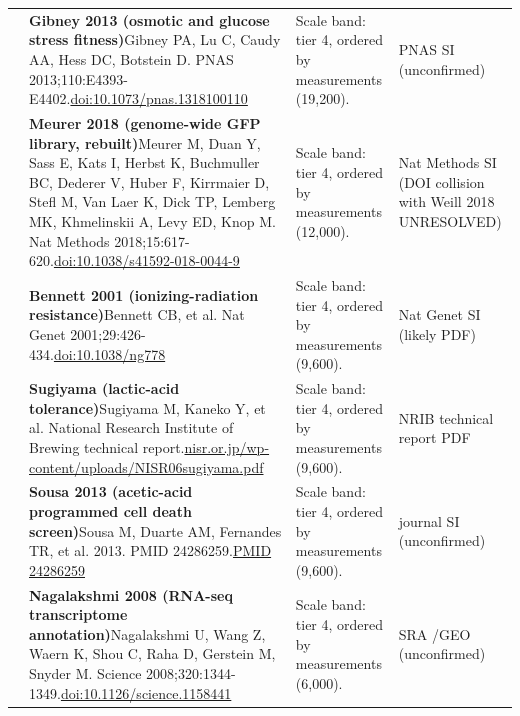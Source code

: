 \begin{landscape}
\begin{longtable}{@{}r@{\hspace{4pt}} L{86mm} L{92mm} L{62mm}@{}}
 & \textbf{Gibney 2013 (osmotic and glucose stress fitness)}\newline Gibney PA, Lu C, Caudy AA, Hess DC, Botstein D. PNAS 2013;110:E4393-E4402.\newline \href{https://doi.org/10.1073/pnas.1318100110}{doi:10.1073/\allowbreak pnas.1318100110} & Scale band: tier 4, ordered by measurements (19,200). & PNAS SI (unconfirmed) \\
 & \textbf{Meurer 2018 (genome-wide GFP library, rebuilt)}\newline Meurer M, Duan Y, Sass E, Kats I, Herbst K, Buchmuller BC, Dederer V, Huber F, Kirrmaier D, Stefl M, Van Laer K, Dick TP, Lemberg MK, Khmelinskii A, Levy ED, Knop M. Nat Methods 2018;15:617-620.\newline \href{https://doi.org/10.1038/s41592-018-0044-9}{doi:10.1038/\allowbreak s41592-018-0044-9} & Scale band: tier 4, ordered by measurements (12,000). & Nat Methods SI (DOI collision with Weill 2018 UNRESOLVED) \\
 & \textbf{Bennett 2001 (ionizing-radiation resistance)}\newline Bennett CB, et al. Nat Genet 2001;29:426-434.\newline \href{https://doi.org/10.1038/ng778}{doi:10.1038/\allowbreak ng778} & Scale band: tier 4, ordered by measurements (9,600). & Nat Genet SI (likely PDF) \\
 & \textbf{Sugiyama (lactic-acid tolerance)}\newline Sugiyama M, Kaneko Y, et al. National Research Institute of Brewing technical report.\newline \href{https://www.nisr.or.jp/wp-content/uploads/NISR06sugiyama.pdf}{nisr.or.jp/\allowbreak wp-content/\allowbreak uploads/\allowbreak NISR06sugiyama.pdf} & Scale band: tier 4, ordered by measurements (9,600). & NRIB technical report PDF \\
 & \textbf{Sousa 2013 (acetic-acid programmed cell death screen)}\newline Sousa M, Duarte AM, Fernandes TR, et al. 2013. PMID 24286259.\newline \href{https://pubmed.ncbi.nlm.nih.gov/24286259/}{PMID 24286259} & Scale band: tier 4, ordered by measurements (9,600). & journal SI (unconfirmed) \\
 & \textbf{Nagalakshmi 2008 (RNA-seq transcriptome annotation)}\newline Nagalakshmi U, Wang Z, Waern K, Shou C, Raha D, Gerstein M, Snyder M. Science 2008;320:1344-1349.\newline \href{https://doi.org/10.1126/science.1158441}{doi:10.1126/\allowbreak science.1158441} & Scale band: tier 4, ordered by measurements (6,000). & SRA /\allowbreak  GEO (unconfirmed) \\

\end{longtable}
\end{landscape}
